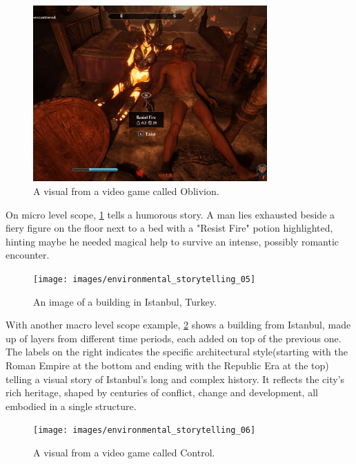     \begin{figure}[H]
    \centering
    \includegraphics[width=0.8\textwidth]{images/environmental_storytelling_04}
    \caption{A visual from a video game called Oblivion.}
    \label{fig:ES_02}
    \end{figure}

    On micro level scope, \ref{fig:ES_02} tells a humorous story. A man lies exhausted beside a fiery figure on the floor next to a bed with a "Resist Fire" potion highlighted, hinting maybe he needed magical help to survive an intense, possibly romantic encounter.\par

    \begin{figure}[H]
    \centering
    \texttt{[image: images/environmental\_storytelling\_05]}
    \caption{An image of a building in Istanbul, Turkey.}
    \label{fig:ES_03}
    \end{figure}

    With another macro level scope example, \ref{fig:ES_03} shows a building from Istanbul, made up of layers from different time periods, each added on top of the previous one. The labels on the right indicates the specific architectural style(starting with the Roman Empire at the bottom and ending with the Republic Era at the top) telling a visual story of Istanbul’s long and complex history. It reflects the city’s rich heritage, shaped by centuries of conflict, change and development, all embodied in a single structure.\par

    \begin{figure}[H]
    \centering
    \texttt{[image: images/environmental\_storytelling\_06]}
    \caption{A visual from a video game called Control.}
    \label{fig:ES_04}
    \end{figure}

